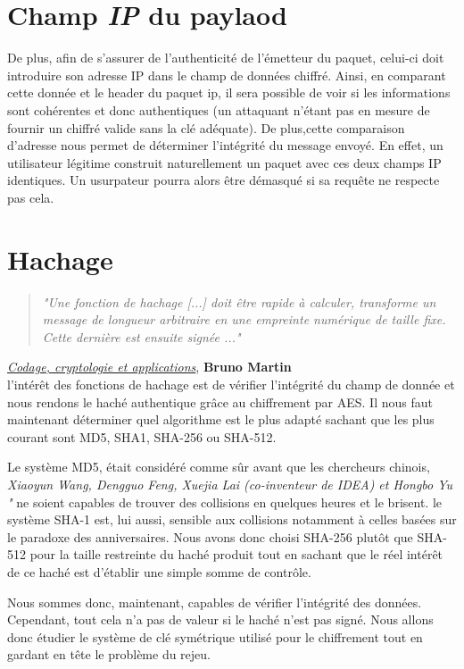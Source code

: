 \section{Champ \textbf{\emph{IP}} du paylaod}

De plus, afin de s'assurer de l'authenticité de l'émetteur du paquet, celui-ci doit introduire son adresse IP dans le champ de données chiffré. Ainsi, en comparant cette donnée et le header du paquet ip, il sera possible de voir si les informations sont cohérentes et donc authentiques (un attaquant n'étant pas en mesure de fournir un chiffré valide sans la clé adéquate). 
De plus,cette comparaison d'adresse nous permet de déterminer l'intégrité du message envoyé.
En effet, un utilisateur légitime construit naturellement un paquet avec ces deux champs IP identiques. Un usurpateur pourra alors être démasqué si sa requête ne respecte pas cela.

\section{Hachage}
\begin{quotation}
\emph{"Une fonction de hachage [...] doit être rapide à calculer, transforme un message de longueur arbitraire en une empreinte numérique de taille fixe. Cette dernière est ensuite signée ..."}
\end{quotation}
\underline{\emph{Codage, cryptologie et applications}}, \textbf{Bruno Martin}\\

l'intérêt des fonctions de hachage est de vérifier l'intégrité du champ de donnée et nous rendons le haché authentique grâce au chiffrement par AES.
Il nous faut maintenant déterminer quel algorithme est le plus adapté sachant que les plus courant sont MD5, SHA1, SHA-256 ou SHA-512.\newline

Le système MD5, était considéré comme sûr avant que les chercheurs chinois, \emph{Xiaoyun Wang, Dengguo Feng, Xuejia Lai (co-inventeur de IDEA) et Hongbo Yu "} ne soient capables de trouver des collisions en quelques heures et le brisent.
le système SHA-1 est, lui aussi, sensible aux collisions notamment à celles basées sur le paradoxe des anniversaires.
Nous avons donc choisi SHA-256 plutôt que SHA-512 pour la taille restreinte du haché produit tout en sachant que le réel intérêt de ce haché est d'établir une simple somme de contrôle.\newline

Nous sommes donc, maintenant, capables de vérifier l'intégrité des données. Cependant, tout cela n'a pas de valeur si le haché n'est pas signé. Nous allons donc étudier le système de clé symétrique utilisé pour le chiffrement tout en gardant en tête le problème du rejeu.
 
